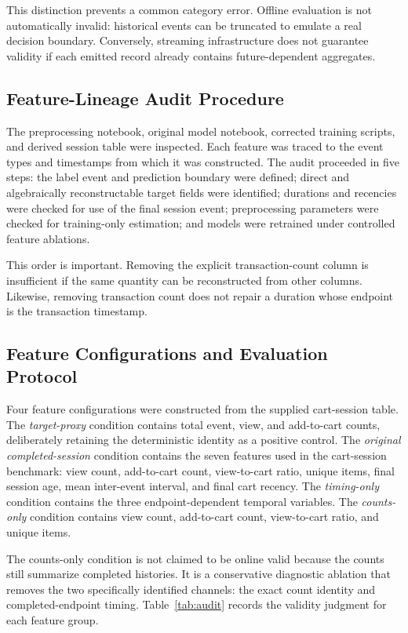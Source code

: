 \documentclass[conference, letterpaper]{IEEEtran}
\begin{document}
This distinction prevents a common category error. Offline evaluation is not automatically invalid: historical events can be truncated to emulate a real decision boundary. Conversely, streaming infrastructure does not guarantee validity if each emitted record already contains future-dependent aggregates.

\subsection{Feature-Lineage Audit Procedure}
The preprocessing notebook, original model notebook, corrected training scripts, and derived session table were inspected. Each feature was traced to the event types and timestamps from which it was constructed. The audit proceeded in five steps: the label event and prediction boundary were defined; direct and algebraically reconstructable target fields were identified; durations and recencies were checked for use of the final session event; preprocessing parameters were checked for training-only estimation; and models were retrained under controlled feature ablations.

This order is important. Removing the explicit transaction-count column is insufficient if the same quantity can be reconstructed from other columns. Likewise, removing transaction count does not repair a duration whose endpoint is the transaction timestamp.

\subsection{Feature Configurations and Evaluation Protocol}
Four feature configurations were constructed from the supplied cart-session table. The \emph{target-proxy} condition contains total event, view, and add-to-cart counts, deliberately retaining the deterministic identity as a positive control. The \emph{original completed-session} condition contains the seven features used in the cart-session benchmark: view count, add-to-cart count, view-to-cart ratio, unique items, final session age, mean inter-event interval, and final cart recency. The \emph{timing-only} condition contains the three endpoint-dependent temporal variables. The \emph{counts-only} condition contains view count, add-to-cart count, view-to-cart ratio, and unique items.

The counts-only condition is not claimed to be online valid because the counts still summarize completed histories. It is a conservative diagnostic ablation that removes the two specifically identified channels: the exact count identity and completed-endpoint timing. Table~\ref{tab:audit} records the validity judgment for each feature group.
\end{document}
